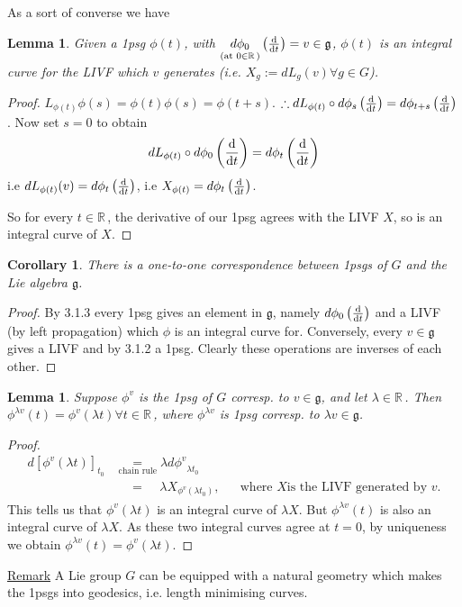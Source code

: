 \documentclass[12pt,a4paper]{article}
\newcommand{\rR}{\ensuremath{\mathbb{R}\,}}
\newcommand{\dgq}[2]{\ensuremath{d {#1}_{#2}}}
\newcommand{\lalg}{\ensuremath{\mathfrak{g}}}
\newcommand{\ul}[1]{\underline{#1}}
\newtheorem{lemma}[thm]{Lemma}
\newtheorem{cor}[thm]{Corollary}
\begin{document}
As a sort of converse we have 
\begin{lemma}
Given a 1psg $\phi(t)$, with $\underset{(\text{at } 0 \in \rR)}{\dgq{\phi}{0}}\left(\dv{t}\right)=v\in \lalg$, $\phi(t)$ is an integral curve for the LIVF which $v$ generates (i.e. $X_g:=\dgq{L}{g}(v) \forall g\in G$).
\end{lemma}
\begin{proof}
$L_{\phi(t)}\phi(s)=\phi(t)\phi(s)=\phi(t+s)$.
$\therefore \dgq{L}{\phi(t)}\circ \dgq{\phi}{s}\left(\dv{t}\right)=\dgq{\phi}{t+s}\left(\dv{t}\right)$.
Now set $s=0$ to obtain
\[ \dgq{L}{\phi(t)}\circ \dgq{\phi}{0}\left(\dv{t}\right)=\dgq{\phi}{t}\left(\dv{t}\right)\]
i.e $\dgq{L}{\phi(t)}(v)=\dgq{\phi}{t}\left(\dv{t}\right)$,
i.e  $X_{\phi(t)}=\dgq{\phi}{t}\left(\dv{t}\right)$.

So for every $t\in \rR$, the derivative of our 1psg agrees with the LIVF $X$, so is an integral curve of $X$.
\end{proof}
\begin{cor}
There is a one-to-one correspondence between 1psgs of $G$ and the Lie algebra \lalg.
\end{cor}
\begin{proof}
By 3.1.3 every 1psg gives an element in \lalg, namely $\dgq{\phi}{0}\left(\dv{t}\right)$ and a LIVF (by left propagation) which $\phi$ is an integral curve for. Conversely, every $v\in\lalg$ gives a LIVF and by 3.1.2 a 1psg. Clearly these operations are inverses of each other.
\end{proof}

\begin{lemma}
Suppose $\phi^v$ is the 1psg of $G$ corresp. to $v\in \lalg$, and let $\lambda \in \rR$. Then $\phi^{\lambda v}(t) = \phi^v(\lambda t) \forall t\in \rR$, where  $\phi^{\lambda v}$ is 1psg corresp. to $\lambda v \in \lalg$.
\end{lemma}
\begin{proof}
\begin{align*}
\dgq{\left[\phi^{v}(\lambda t)\right]}{t_0}&\underset{\text{chain rule}}{=}\lambda \dgq{\phi^v}{\lambda t_0}\\
&\underset{\phantom{chain rule}}{=}\lambda X_{\phi^v(\lambda t_0)}, && \text{where } X \text{is the LIVF generated by } v.
\end{align*}
This tells us that $\phi^v(\lambda t)$ is an integral curve of $\lambda X$. But $\phi^{\lambda v}(t)$ is also an integral curve of $\lambda X$.
As these two integral curves agree at $t=0$, by uniqueness we obtain $\phi^{\lambda v}(t)=\phi^v (\lambda t)$.
\end{proof}
\ul{Remark} A Lie group $G$ can be equipped with a natural geometry which makes the 1psgs into geodesics, i.e. length minimising curves.
\end{document}
